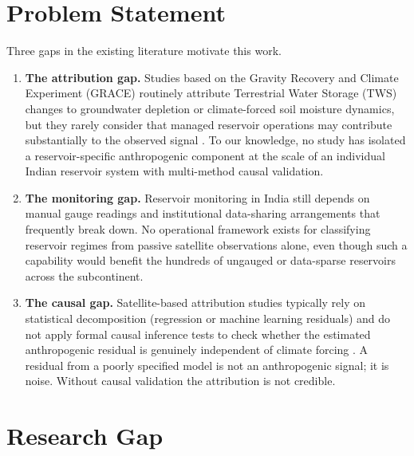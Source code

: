 \documentclass[12pt,a4paper,oneside]{report}
\begin{document}
\section{Problem Statement}

Three gaps in the existing literature motivate this work.

\begin{enumerate}[leftmargin=*]
  \item \textbf{The attribution gap.} Studies based on the Gravity Recovery
    and Climate Experiment (GRACE) routinely attribute Terrestrial Water
    Storage (TWS) changes to groundwater depletion or climate-forced soil
    moisture dynamics, but they rarely consider that managed reservoir
    operations may contribute substantially to the observed signal
    \citep{Rodell2009,Long2020}. To our knowledge, no study has isolated a
    reservoir-specific anthropogenic component at the scale of an individual
    Indian reservoir system with multi-method causal validation.

  \item \textbf{The monitoring gap.} Reservoir monitoring in India still
    depends on manual gauge readings and institutional data-sharing
    arrangements that frequently break down. No operational framework exists
    for classifying reservoir regimes from passive satellite observations
    alone, even though such a capability would benefit the hundreds of
    ungauged or data-sparse reservoirs across the subcontinent.

  \item \textbf{The causal gap.} Satellite-based attribution studies
    typically rely on statistical decomposition (regression or machine
    learning residuals) and do not apply formal causal inference tests to
    check whether the estimated anthropogenic residual is genuinely
    independent of climate forcing \citep{Ji2023}. A residual from a poorly
    specified model is not an anthropogenic signal; it is noise. Without
    causal validation the attribution is not credible.
\end{enumerate}

\section{Research Gap}
\end{document}
